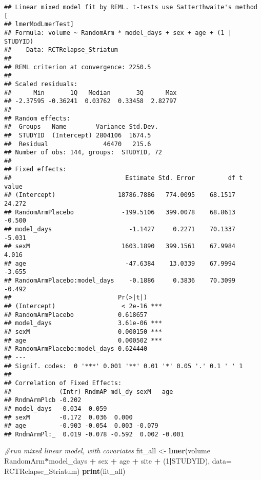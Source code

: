 \documentclass[]{article}
\newenvironment{Shaded}{\begin{snugshade}}{\end{snugshade}}
\newcommand{\KeywordTok}[1]{\textcolor[rgb]{0.13,0.29,0.53}{\textbf{#1}}}
\newcommand{\DataTypeTok}[1]{\textcolor[rgb]{0.13,0.29,0.53}{#1}}
\newcommand{\DecValTok}[1]{\textcolor[rgb]{0.00,0.00,0.81}{#1}}
\newcommand{\StringTok}[1]{\textcolor[rgb]{0.31,0.60,0.02}{#1}}
\newcommand{\CommentTok}[1]{\textcolor[rgb]{0.56,0.35,0.01}{\textit{#1}}}
\newcommand{\OperatorTok}[1]{\textcolor[rgb]{0.81,0.36,0.00}{\textbf{#1}}}
\newcommand{\NormalTok}[1]{#1}
\theoremstyle{definition}
\theoremstyle{definition}
\theoremstyle{definition}
\theoremstyle{remark}
\begin{document}
\begin{verbatim}
## Linear mixed model fit by REML. t-tests use Satterthwaite's method [
## lmerModLmerTest]
## Formula: volume ~ RandomArm * model_days + sex + age + (1 | STUDYID)
##    Data: RCTRelapse_Striatum
## 
## REML criterion at convergence: 2250.5
## 
## Scaled residuals: 
##      Min       1Q   Median       3Q      Max 
## -2.37595 -0.36241  0.03762  0.33458  2.82797 
## 
## Random effects:
##  Groups   Name        Variance Std.Dev.
##  STUDYID  (Intercept) 2804106  1674.5  
##  Residual               46470   215.6  
## Number of obs: 144, groups:  STUDYID, 72
## 
## Fixed effects:
##                               Estimate Std. Error         df t value
## (Intercept)                 18786.7886   774.0095    68.1517  24.272
## RandomArmPlacebo             -199.5106   399.0078    68.8613  -0.500
## model_days                     -1.1427     0.2271    70.1337  -5.031
## sexM                         1603.1890   399.1561    67.9984   4.016
## age                           -47.6384    13.0339    67.9994  -3.655
## RandomArmPlacebo:model_days    -0.1886     0.3836    70.3099  -0.492
##                             Pr(>|t|)    
## (Intercept)                  < 2e-16 ***
## RandomArmPlacebo            0.618657    
## model_days                  3.61e-06 ***
## sexM                        0.000150 ***
## age                         0.000502 ***
## RandomArmPlacebo:model_days 0.624440    
## ---
## Signif. codes:  0 '***' 0.001 '**' 0.01 '*' 0.05 '.' 0.1 ' ' 1
## 
## Correlation of Fixed Effects:
##             (Intr) RndmAP mdl_dy sexM   age   
## RndmArmPlcb -0.202                            
## model_days  -0.034  0.059                     
## sexM        -0.172  0.036  0.000              
## age         -0.903 -0.054  0.003 -0.079       
## RndmArmPl:_  0.019 -0.078 -0.592  0.002 -0.001
\end{verbatim}

\begin{Shaded}
\begin{Highlighting}[]
\CommentTok{#run mixed linear model, with covariates}
\NormalTok{  fit_all <-}\StringTok{ }\KeywordTok{lmer}\NormalTok{(volume }\OperatorTok{~}\StringTok{ }\NormalTok{RandomArm}\OperatorTok{*}\NormalTok{model_days }\OperatorTok{+}\StringTok{ }\NormalTok{sex }\OperatorTok{+}\StringTok{ }\NormalTok{age }\OperatorTok{+}\StringTok{ }\NormalTok{site }\OperatorTok{+}\StringTok{ }\NormalTok{(}\DecValTok{1}\OperatorTok{|}\NormalTok{STUDYID), }\DataTypeTok{data=}\NormalTok{ RCTRelapse_Striatum)}
  \KeywordTok{print}\NormalTok{(fit_all)}
\end{Highlighting}
\end{Shaded}
\end{document}

